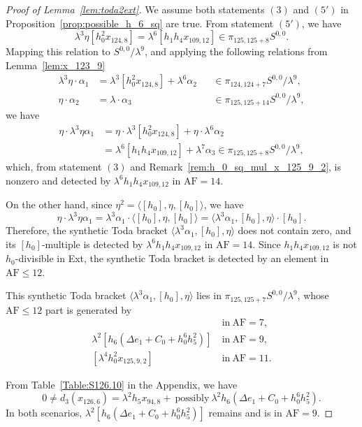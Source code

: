 \documentclass{amsart}
\numberwithin{equation}{section}
\newcommand{\AF}{\mathrm{AF}}
\begin{document}
\begin{proof}[Proof of Lemma~\ref{lem:toda2ext}]
    We assume both statements $(3)$ and $(5')$ in Proposition~\ref{prop:possible_h_6_sq} are true. From statement $(5')$, we have 
    $$\lambda^3 \eta [h_0^2x_{124,8}] = \lambda^6 [h_1h_4x_{109,12}] \in \pi_{125,125+8} S^{0,0}.$$
Mapping this relation to $S^{0,0}/\lambda^9$, and applying the following relations from Lemma~\ref{lem:x_123_9}
\begin{align*}
        \lambda^3 \eta \cdot \alpha_1 & = \lambda^3 [h_0^2 x_{124,8}] + 
\lambda^6 \alpha_2 && \in \pi_{124,124+7} S^{0,0}/\lambda^9,\\
\eta \cdot \alpha_2 & = \lambda \cdot \alpha_3 && \in \pi_{125,125+14} S^{0,0}/\lambda^9,
    \end{align*}
we have
\begin{align*}
    \eta \cdot \lambda^3 \eta \alpha_1 & = \eta \cdot \lambda^3 [h_0^2 x_{124,8}] + \eta \cdot \lambda^6 \alpha_2\\
   & = \lambda^6 [h_1h_4x_{109,12}] + \lambda^7 \alpha_3 \in \pi_{125,125+8} S^{0,0}/\lambda^9,
 \end{align*}
 which, from statement $(3)$ and Remark~\ref{rem:h_0_sq_mul_x_125_9_2}, is nonzero and detected by $\lambda^6 h_1h_4x_{109,12}$ in $\AF=14$.
 
 On the other hand, since $\eta^2 = \langle [h_0], \eta, [h_0] \rangle$, we have
 $$\eta \cdot \lambda^3 \eta \alpha_1 = \lambda^3 \alpha_1 \cdot \langle [h_0], \eta, [h_0] \rangle = \langle \lambda^3 \alpha_1, [h_0], \eta \rangle \cdot [h_0].$$
 Therefore, the synthetic Toda bracket
$\langle \lambda^3 \alpha_1, [h_0], \eta \rangle$
    does not contain zero, and its $[h_0]$-multiple is detected by $\lambda^6 h_1h_4x_{109,12}$ in $\AF=14$. Since $h_1h_4x_{109,12}$ is not $h_0$-divisible in Ext, the synthetic Toda bracket is detected by an element in $\AF \le 12$.
    

This synthetic Toda bracket $\langle \lambda^3 \alpha_1, [h_0], \eta \rangle$ lies in $\pi_{125,125+7} S^{0,0}/\lambda^9$, whose $\AF \le 12$ part is generated by
\begin{align*}
[h_0^2 x_{125,5}] \ & \text{in} \ \AF=7,\\ 
\lambda^2 [h_6(\Delta e_1 +C_0+h_0^6h_5^2)] \ & \text{in} \ \AF=9,\\ 
[\lambda^4 h_0^2 x_{125,9,2}] \ & \text{in} \ \AF=11.
\end{align*}
%


%

%
%
%
From Table~\ref{Table:S126.10} in the Appendix, we have
$$0 \neq d_3(x_{126,6}) = \lambda^2 h_5 x_{94,8} + \ \text{possibly} \ \lambda^2 h_6(\Delta e_1 +C_0+h_0^6h_5^2).$$ 
In both scenarios, $\lambda^2 [h_6(\Delta e_1 +C_0+h_0^6h_5^2)]$ remains and is in $\AF=9$.


\end{proof}
\end{document}
